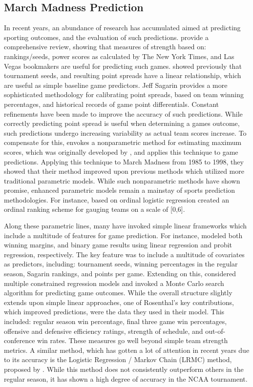 \documentclass[letterpaper,12pt]{article}
\begin{document}
\subsection{March Madness Prediction \label{methods_review}}
In recent years, an abundance of research has accumulated aimed at predicting sporting outcomes, and the evaluation of such predictions. \cite{boulier2003predicting} provide a comprehensive review, showing that measures of strength based on:  rankings/seeds, power scores as calculated by The New York Times,  and Las Vegas bookmakers are useful for predicting such games. \cite{smith1999can} showed previously that tournament seeds, and resulting point spreads have a linear relationship, which are useful as simple baseline game predictors. Jeff Sagarin \citep{sagarin} provides a more sophisticated methodology for calibrating point spreads, based on team winning percentages, and historical records of game point differentials. 
Constant refinements have been made to improve the accuracy of such predictions. While correctly predicting point spread is useful when determining a games outcome, such predictions undergo increasing variability as actual team scores increase. To compensate for this, 
\cite{caudill2003predicting} envokes a nonparametric method for estimating maximum scores, which was originally developed by \cite{manski1977estimation}, and applies this technique to game predictions.
Applying this technique to March Madness from 1985 to 1998, they showed that their method improved upon previous methods which utilized more traditional parametric models. While such nonparametric methods have shown promise, enhanced parametric models remain a mainstay of sports prediction methodologies. For instance, based on ordinal logistic regression \cite{west2006simple} created an ordinal ranking scheme for gauging teams on a scale of [0,6]. 

Along these parametric lines, many have invoked simple linear frameworks which include a multitude of features for game prediction. For instance, \cite{wright2012statistical} modeled both winning margins, and binary game results using linear regression and probit regression, respectively. The key feature was to include a multitude of covariates as predictors, including: tournament seeds, winning percentages in the regular season, Sagarin rankings, and points per game. Extending on this, 
\cite{rosenthal} considered multiple constrained regression models and invoked a Monte Carlo search algorithm for predicting game outcomes. While the overall structure slightly extends upon simple linear approaches, one of Rosenthal's key contributions, which improved predictions, were the data they used in their model. This included: regular season win percentage, final three game win percentages, offensive and defensive efficiency ratings, strength of schedule, and out-of-conference win rates. These measures go well beyond simple team strength metrics. A similar method, which has gotten a lot of attention in recent years due to its accuracy is the Logistic Regression / Markov Chain (LRMC) method, proposed by \cite{Kvam2006}. While this method does not consistently outperform others in the regular season, it has shown a high degree of accuracy in the NCAA tournament.
\end{document}
